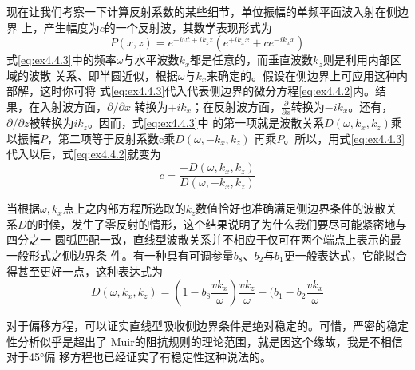现在让我们考察一下计算反射系数的某些细节，单位振幅的单频平面波入射在侧边界
上，产生幅度为$c$的一个反射波，其数学表现形式为
\begin{equation}
P(x,z)=e^{-i\omega t+ik_zz}(e^{+ik_xx}+ce^{-ik_xx})
\label{eq:ex4.4.3}
\end{equation}
式\ref{eq:ex4.4.3}中的频率$\omega$与水平波数$k_x$都是任意的，而垂直波数$k_z$则是利用内部区域的波散
关系、即半圆近似，根据$\omega$与$k_x$来确定的。假设在侧边界上可应用这种内部解，这时你可将
式\ref{eq:ex4.4.3}代入代表侧边界的微分方程\ref{eq:ex4.4.2}内。结果，在入射波方面，$\partial/\partial x$
转换为$+ik_x$；在反射波方面，$\frac{\partial}{\partial x}$转换为$-ik_x$。还有，$\partial/\partial z$被转换为$ik_z$。因而，式\ref{eq:ex4.4.3}中
的第一项就是波散关系$D(\omega,k_x,k_z)$乘以振幅$P$，第二项等于反射系数c乘$D(\omega,-k_x,k_z)$
再乘$P$。所以，用式\ref{eq:ex4.4.3}代入以后，式\ref{eq:ex4.4.2}就变为
\begin{equation}
c=\frac{-D(\omega,k_x,k_z)}{D(\omega,-k_x,k_z)}
\label{eq:ex4.4.4}
\end{equation}

当根据$\omega,k_x$点上之内部方程所选取的$k_z$数值恰好也准确满足侧边界条件的波散关
系$D$的时候，发生了零反射的情形，这个结果说明了为什么我们要尽可能紧密地与四分之一
圆弧匹配一致，直线型波散关系并不相应于仅可在两个端点上表示的最一般形式之侧边界条
件。有一种具有可调参量$b_8$、$b_2$与$b_1$更一般表达式，它能拟合得甚至更好一点，这种表达式为
\begin{equation*}
D(\omega,k_x,k_z)=(1-b_8\frac{vk_x}{\omega})\frac{vk_z}{\omega}-(b_1-b_2\frac{vk_x}{\omega}
\end{equation*}

对于偏移方程，可以证实直线型吸收侧边界条件是绝对稳定的。可惜，严密的稳定
性分析似乎是超出了
Muir的阻抗规则的理论范围，就是因这个缘故，我是不相信对于45°偏
移方程也已经证实了有稳定性这种说法的。



